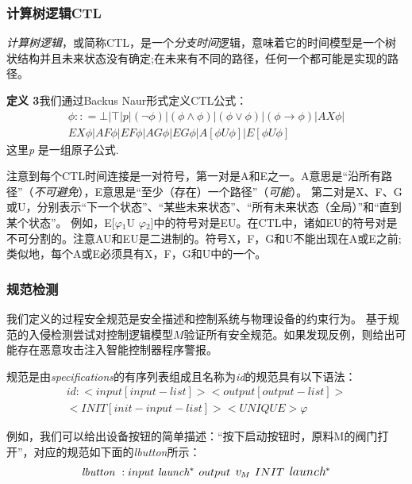 \subsubsection{计算树逻辑CTL}

\textit {计算树逻辑}，或简称CTL，是一个\textit {分支时间}逻辑，意味着它的时间模型是一个树状结构并且未来状态没有确定;在未来有不同的路径，任何一个都可能是实现的路径\parencite {klein2005fault}。

\textbf{定义 3}我们通过Backus Naur形式定义CTL公式：
\begin{equation} 
\begin{split}\phi :: = \bot | \top | p |(\neg\phi) | (\phi\wedge\phi) | (\phi\vee\phi) | (\phi\rightarrow\phi) | AX\phi |\\ EX\phi | AF\phi | EF\phi | AG\phi | EG\phi | A[\phi U \phi] | E[\phi U \phi]\end{split}
\end{equation}
这里\textit{p }是一组原子公式.

注意到每个CTL时间连接是一对符号，第一对是A和E之一。A意思是“沿所有路径”（\textit {不可避免}），E意思是“至少（存在）一个路径”（\textit {可能}）。 第二对是X、F、G或U，分别表示“下一个状态”、“某些未来状态”、“所有未来状态（全局）”和“直到某个状态”。 例如，E[\textit{$\varphi{}$}$_{1 }$U \textit{$\varphi{}$}$_{2}$]中的符号对是EU。在CTL中，诸如EU的符号对是不可分割的。注意AU和EU是二进制的。符号X，F，G和U不能出现在A或E之前;类似地，每个A或E必须具有X，F，G和U中的一个。

\subsubsection{规范检测}

我们定义的过程安全规范是安全描述和控制系统与物理设备的约束行为。 基于规范的入侵检测尝试对控制逻辑模型$M$验证所有安全规范。如果发现反例，则给出可能存在恶意攻击注入智能控制器程序警报。

规范是由\textit {specifications}的有序列表组成且名称为\textit {id}的规范具有以下语法：
\[\begin{split}
id:  <input [input-list]> <output [output-list]> \\
<INIT [init-input-list]> <UNIQUE> \varphi
\end{split}
\]

例如，我们可以给出设备按钮的简单描述：“按下启动按钮时，原料M的阀门打开”，对应的规范如下面的\textit {lbutton}所示：
\[\raggedright
{ \textit{lbutton }: input~ \textit{launch}}{\small {^\ast} }{\large
~output~ \textit{v}_{M} ~INIT~ \textit{launch}}{\small {^\ast} }
\]

